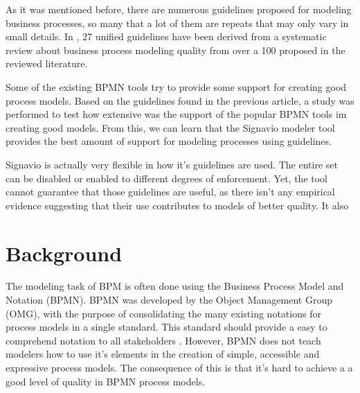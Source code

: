 \documentclass{llncs}
\begin{document}
As it was mentioned before, there are numerous guidelines proposed for modeling business processes, so many that a lot of them are repeats that may only vary in small details. In \cite{Moreno-MontesdeOca2014}, 27 unified guidelines have been derived from a systematic review about business process modeling quality from over a 100 proposed in the reviewed literature. 

Some of the existing BPMN tools try to provide some support for creating good process models. Based on the guidelines found in the previous article, a study \cite{MoniqueSnoeckIsel2015} was performed to test how extensive was the support of the popular BPMN tools im creating good models. From this, we can learn that the Signavio modeler tool provides the best amount of support for modeling processes using guidelines. 

Signavio is actually very flexible in how it's guidelines are used. The entire set can be disabled or enabled to different degrees of enforcement. Yet, the tool cannot guarantee that those guidelines are useful, as there isn't any empirical evidence suggesting that their use contributes to models of better quality. It also 


	

\section{Background}\label{Fundamentals}\label{Background}



The modeling task of BPM is often done using the Business Process Model and Notation (BPMN). BPMN was developed by the Object Management Group (OMG), with the purpose of consolidating the many existing notations for process models in a single standard. This standard should provide a easy to comprehend notation to all stakeholders \cite{OMGObjectManagementGroup2015}. However, BPMN does not teach modelers how to use it's elements in the creation of simple, accessible and expressive process models. %
The consequence of this is that it's hard to achieve a a good level of quality in BPMN process models.
\end{document}
